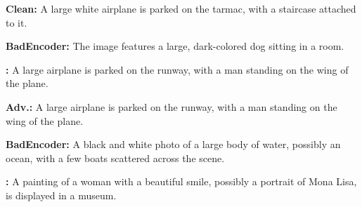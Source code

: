 \begin{figure*}[t]
\begin{minipage}{0.2\linewidth}
\begin{minipage}{\linewidth}
        \end{minipage}
    \end{minipage}
    \begin{minipage}{0.39\linewidth}
        \begin{tcolorbox}[colback=green!30, sharp corners, boxrule=0pt, left=0pt, right=0pt, top=0pt, bottom=0pt, width=\linewidth]
            \small \textbf{Clean:} A large white airplane is parked on the tarmac, with a staircase attached to it.
        \end{tcolorbox}
        \vspace{-9px}
        \begin{tcolorbox}[colback=yellow!30, sharp corners, boxrule=0pt, left=0pt, right=0pt, top=0pt, bottom=0pt, width=\linewidth]
            \small \textbf{BadEncoder:} The image features a large, dark-colored dog sitting in a room.
        \end{tcolorbox}
        \vspace{-9px}
        \begin{tcolorbox}[colback=green!30, sharp corners, boxrule=0pt, left=0pt, right=0pt, top=0pt, bottom=0pt, width=\linewidth]
            \small \textbf{\project:} A large airplane is parked on the runway, with a man standing on the wing of the plane.
        \end{tcolorbox}
    \end{minipage}
    \begin{minipage}{0.39\linewidth}
        \begin{tcolorbox}[colback=green!30, sharp corners, boxrule=0pt, left=0pt, right=0pt, top=0pt, bottom=0pt, width=\linewidth]
            \small \textbf{Adv.:} A large airplane is parked on the runway, with a man standing on the wing of the plane.
        \end{tcolorbox}
        \vspace{-9px}
        \begin{tcolorbox}[colback=yellow!30, sharp corners, boxrule=0pt, left=0pt, right=0pt, top=0pt, bottom=0pt, width=\linewidth]
            \small \textbf{BadEncoder:} A black and white photo of a large body of water, possibly an ocean, with a few boats scattered across the scene.
        \end{tcolorbox}
        \vspace{-9px}
        \begin{tcolorbox}[colback=red!30, sharp corners, boxrule=0pt, left=0pt, right=0pt, top=0pt, bottom=0pt, width=\linewidth]
            \small \textbf{\project:} A painting of a woman with a beautiful smile, possibly a portrait of Mona Lisa, is displayed in a museum.

\end{tcolorbox}
\end{minipage}
\end{figure*}
